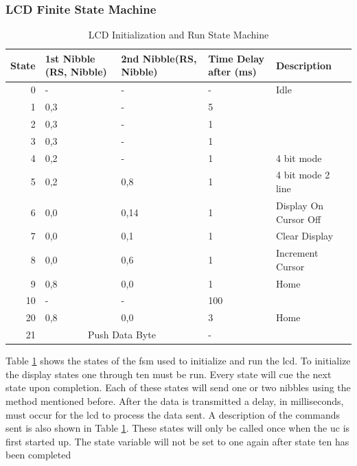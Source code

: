 \documentclass[12pt,a4paper]{report}
\begin{document}
\subsubsection{LCD Finite State Machine}
\begin{table}[h!]
	\centering
	\begin{tabular}{ | r |  p{2.7cm}| p{2.7cm}| p{2.5cm} | l | }
		\hline
		\multicolumn{1}{|l|}{\textbf{State}} & \textbf{1st Nibble \newline (RS, Nibble)} & \textbf{2nd Nibble\newline (RS, Nibble)} & \textbf{Time Delay \newline after (ms)} & \textbf{Description} \\ \hline
		0 & - & - & - & Idle \\ \hline
		1 & 0,3 & - & 5 &  \\ \hline
		2 & 0,3 & - & 1 &  \\ \hline
		3 & 0,3 & - & 1 &  \\ \hline
		4 & 0,2 & - & 1 & 4 bit mode \\ \hline
		5 & 0,2 & 0,8 & 1 & 4 bit mode 2 line \\ \hline
		6 & 0,0 & 0,14 & 1 & Display On Cursor Off \\ \hline
		7 & 0,0 & 0,1 & 1 & Clear Display \\ \hline
		8 & 0,0 & 0,6 & 1 & Increment Cursor \\ \hline
		9 & 0,8 & 0,0 & 1 & Home \\ \hline
		10 & - & - & 100 &  \\ \hline
		20 & 0,8 & 0,0 & 3 & Home \\ \hline
		21 & \multicolumn{2}{c|}{Push Data Byte }  & - &  \\ \hline
	\end{tabular}
	\caption{LCD Initialization and Run State Machine}
	\label{tab:LCDfsm}
\end{table}
\noindent Table \ref{tab:LCDfsm} shows the states of the \ac{fsm} used to initialize and run the \ac{lcd}. To initialize the display states one through ten must be run. Every state will cue the next state upon completion. Each of these states will send one or two nibbles using the method mentioned before. After the data is transmitted a delay, in milliseconds, must occur for the \ac{lcd} to process the data sent. A description of the commands sent is also shown in Table \ref{tab:LCDfsm}. These states will only be called once when the \ac{uc} is first started up. The state variable will not be set to one again after state ten has been completed\\
\end{document}
